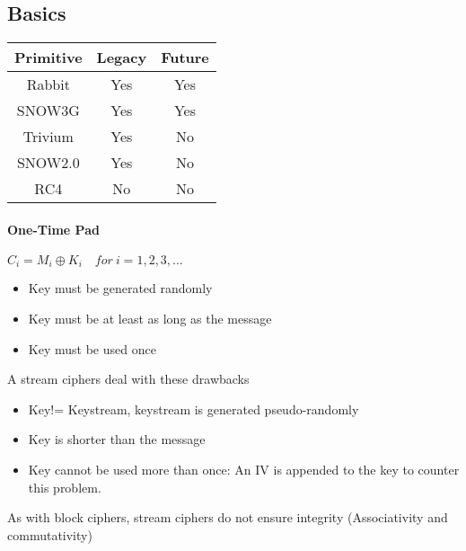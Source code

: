 \subsection{Basics}
\begin{table}
    \centering
    \begin{tabular}{c|c|c}
        Primitive & Legacy & Future\\
        \hline
        Rabbit & Yes & Yes\\
        SNOW3G & Yes & Yes\\
        \hline
        Trivium & Yes & No\\
        SNOW2.0 & Yes & No\\
        \hline
        RC4 & No & No\\
    \end{tabular}
\end{table}

\paragraph{One-Time Pad} $C_i = M_i \oplus K_i\quad for\ i=1,2,3,\ldots$
\begin{itemize}
    \item Key must be generated randomly
    \item Key must be at least as long as the message
    \item Key must be used once
\end{itemize}
A stream ciphers deal with these drawbacks
\begin{itemize}
    \item Key!= Keystream, keystream is generated pseudo-randomly
    \item Key is shorter than the message
    \item Key cannot be used more than once: An IV is appended to the key to
    counter this problem.
\end{itemize}
As with block ciphers, stream ciphers do not ensure integrity (Associativity
and commutativity)

